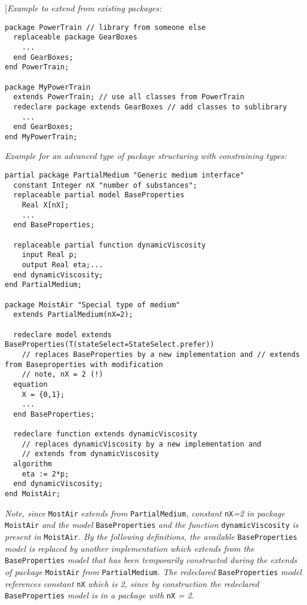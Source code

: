 {[}\emph{Example to extend from existing packages:}
\begin{lstlisting}[language=modelica]
package PowerTrain // library from someone else
  replaceable package GearBoxes
    ...
  end GearBoxes;
end PowerTrain;

package MyPowerTrain
  extends PowerTrain; // use all classes from PowerTrain
  redeclare package extends GearBoxes // add classes to sublibrary
    ...
  end GearBoxes;
end MyPowerTrain;
\end{lstlisting}

\emph{Example for an advanced type of package structuring with
constraining types:}
\begin{lstlisting}[language=modelica]
partial package PartialMedium "Generic medium interface"
  constant Integer nX "number of substances";
  replaceable partial model BaseProperties
    Real X[nX];
    ...
  end BaseProperties;

  replaceable partial function dynamicViscosity
    input Real p;
    output Real eta;...
  end dynamicViscosity;
end PartialMedium;

package MoistAir "Special type of medium"
  extends PartialMedium(nX=2);

  redeclare model extends BaseProperties(T(stateSelect=StateSelect.prefer))
    // replaces BaseProperties by a new implementation and // extends from Baseproperties with modification
    // note, nX = 2 (!)
  equation
    X = {0,1};
    ...
  end BaseProperties;

  redeclare function extends dynamicViscosity
    // replaces dynamicViscosity by a new implementation and
    // extends from dynamicViscosity
  algorithm
    eta := 2*p;
  end dynamicViscosity;
end MoistAir;
\end{lstlisting}

\emph{Note, since} \lstinline!MostAir! \emph{extends from} \lstinline!PartialMedium!\emph{,
constant} \lstinline!nX!\emph{=2 in package} \lstinline!MoistAir! \emph{and the model}
\lstinline!BaseProperties! \emph{and the function} \lstinline!dynamicViscosity! \emph{is present
in} \lstinline!MoistAir!\emph{. By the following definitions, the available}
\lstinline!BaseProperties! \emph{model is replaced by another implementation which
extends from the} \lstinline!BaseProperties! \emph{model that has been temporarily
constructed during the extends of package} \lstinline!MoistAir! \emph{from}
\lstinline!PartialMedium!\emph{. The redeclared} \lstinline!BaseProperties! \emph{model
references constant} \lstinline!nX! \emph{which is 2, since by construction the
redeclared} \lstinline!BaseProperties! \emph{model is in a package with} \lstinline!nX! \emph{=
2.}

